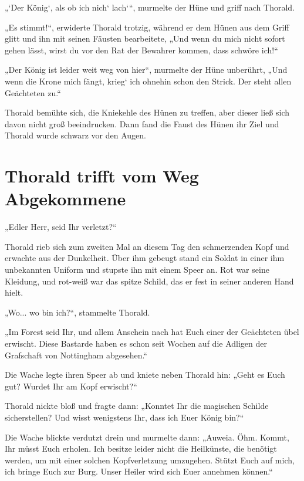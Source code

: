 „‘Der König‘, als ob ich nich‘ lach‘“, murmelte der Hüne und griff nach Thorald.

„Es stimmt!“, erwiderte Thorald trotzig, während er dem Hünen aus dem Griff glitt und ihn mit seinen Fäusten bearbeitete, „Und wenn du mich nicht sofort gehen lässt, wirst du vor den Rat der Bewahrer kommen, dass schwöre ich!“

„Der König ist leider weit weg von hier“, murmelte der Hüne unberührt, „Und wenn die Krone mich fängt, krieg‘ ich ohnehin schon den Strick. Der steht allen Geächteten zu.“

Thorald bemühte sich, die Kniekehle des Hünen zu treffen, aber dieser ließ sich davon nicht groß beeindrucken. Dann fand die Faust des Hünen ihr Ziel und Thorald wurde schwarz vor den Augen.













\newpage
\section{Thorald trifft vom Weg Abgekommene}

„Edler Herr, seid Ihr verletzt?“

Thorald rieb sich zum zweiten Mal an diesem Tag den schmerzenden Kopf und erwachte aus der Dunkelheit. Über ihm gebeugt stand ein Soldat in einer ihm unbekannten Uniform und stupste ihn mit einem Speer an. Rot war seine Kleidung, und rot-weiß war das spitze Schild, das er fest in seiner anderen Hand hielt.

„Wo... wo bin ich?“, stammelte Thorald.

„Im Forest seid Ihr, und allem Anschein nach hat Euch einer der Geächteten übel erwischt. Diese Bastarde haben es schon seit Wochen auf die Adligen der Grafschaft von Nottingham abgesehen.“

Die Wache legte ihren Speer ab und kniete neben Thorald hin: „Geht es Euch gut? Wurdet Ihr am Kopf erwischt?“

Thorald nickte bloß und fragte dann: „Konntet Ihr die magischen Schilde sicherstellen? Und wisst wenigstens Ihr, dass ich Euer König bin?“

Die Wache blickte verdutzt drein und murmelte dann: „Auweia. Öhm. Kommt, Ihr müsst Euch erholen. Ich besitze leider nicht die Heilkünste, die benötigt werden, um mit einer solchen Kopfverletzung umzugehen. Stützt Euch auf mich, ich bringe Euch zur Burg. Unser Heiler wird sich Euer annehmen können.“


